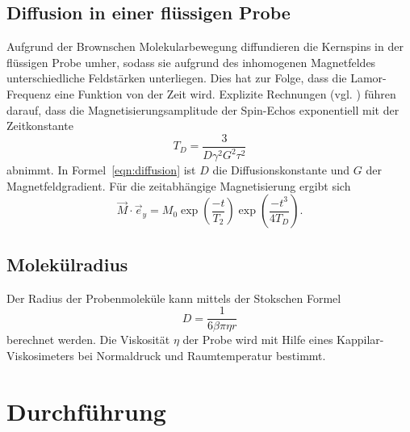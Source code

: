 \subsection{Diffusion in einer flüssigen Probe}
Aufgrund der Brownschen Molekularbewegung diffundieren die
Kernspins in der flüssigen Probe umher, sodass sie aufgrund des inhomogenen
Magnetfeldes unterschiedliche Feldstärken unterliegen.
Dies hat zur Folge, dass die Lamor-Frequenz eine Funktion von der Zeit wird.
Explizite Rechnungen (vgl. \cite{anleitung}) führen darauf, dass die Magnetisierungsamplitude
der Spin-Echos exponentiell mit der Zeitkonstante
\begin{equation}
  \label{eqn:diffusion}
  T_{D} = \frac{3}{D\gamma^2G^2\tau^2}
\end{equation}
abnimmt.
In Formel~\eqref{eqn:diffusion} ist $D$ die Diffusionskonstante und $G$
der Magnetfeldgradient.
Für die zeitabhängige Magnetisierung ergibt sich
\begin{equation}
  \label{eqn:mag_diffusion}
  \vec{M}\cdot\vec{e}_y = M_0\exp{\left(\frac{-t}{T_2}\right)}\exp{\left(\frac{-t^3}{4T_{D}}\right)}.
\end{equation}

\subsection{Molekülradius}
Der Radius der Probenmoleküle kann mittels der Stokschen Formel
\begin{equation}
  \label{eqn:diffkonst}
  D = \frac{1}{6\beta\pi\eta r}
\end{equation}
berechnet werden. Die Viskosität $\eta$ der Probe wird mit Hilfe eines Kappilar-Viskosimeters
bei Normaldruck und Raumtemperatur bestimmt.

\section{Durchführung}
